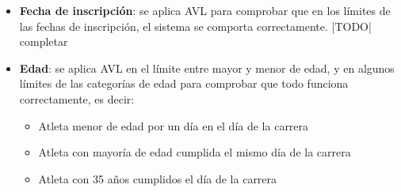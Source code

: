 \begin{itemize}
	\item \textbf{Fecha de inscripción}: se aplica AVL para comprobar que en los límites de las
		fechas de inscripción, el sistema se comporta correctamente. |TODO| completar
	\item \textbf{Edad}: se aplica AVL en el límite entre mayor y menor de edad, y en algunos
		límites de las categorías de edad para comprobar que todo funciona correctamente, es
		decir: \begin{itemize}
			\item Atleta menor de edad por un día en el día de la carrera
			\item Atleta con mayoría de edad cumplida el mismo día de la carrera
			\item Atleta con 35 años cumplidos el día de la carrera
		\end{itemize}
\end{itemize}
